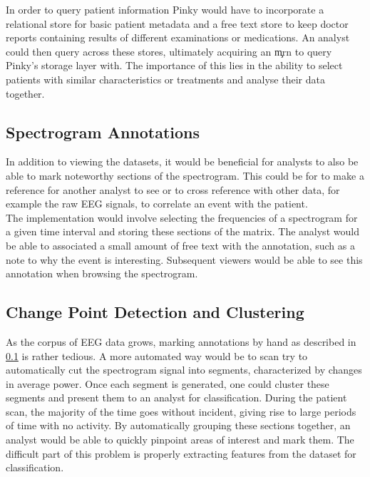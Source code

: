 In order to query patient information Pinky would have to incorporate a
relational store for basic patient metadata and a free text store to keep
doctor reports containing results of different examinations or medications. An
analyst could then query across these stores, ultimately acquiring an \c{mrn}
to query Pinky's storage layer with. The importance of this lies in the ability
to select patients with similar characteristics or treatments and analyse their
data together.

\subsection{Spectrogram Annotations}\label{discuss_ch:annotations}

In addition to viewing the datasets, it would be beneficial for analysts to
also be able to mark noteworthy sections of the spectrogram. This could be for
to make a reference for another analyst to see or to cross reference with other
data, for example the raw EEG signals, to correlate an event with the patient. \\

The implementation would involve selecting the frequencies of a spectrogram for
a given time interval and storing these sections of the matrix.  The analyst
would be able to associated a small amount of free text with the annotation,
such as a note to why the event is interesting. Subsequent viewers would be
able to see this annotation when browsing the spectrogram.

\subsection{Change Point Detection and Clustering}\label{discuss_ch:cpd}

As the corpus of EEG data grows, marking annotations by hand as described in
\ref{discuss_ch:annotations} is rather tedious.  A more automated way would be to scan
try to automatically cut the spectrogram signal into segments, characterized by
changes in average power. Once each segment is generated, one could cluster
these segments and present them to an analyst for classification. During the
patient scan, the majority of the time goes without incident, giving rise to
large periods of time with no activity. By automatically grouping these
sections together, an analyst would be able to quickly pinpoint areas of
interest and mark them. The difficult part of this problem is properly
extracting features from the dataset for classification. \\

